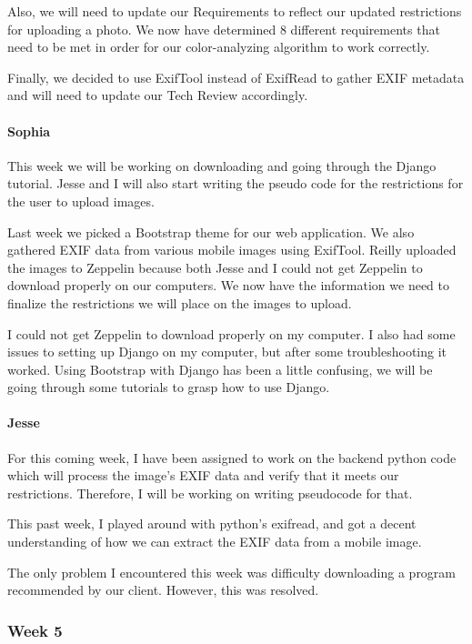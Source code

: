 \documentclass[onecolumn, draftclsnofoot,10pt, compsoc]{IEEEtran}
\begin{document}
\begin{flushleft}
Also, we will need to update our Requirements to reflect our updated restrictions for uploading a photo. We now have determined 8 different requirements that need to be met in order for our color-analyzing algorithm to work correctly.
 
Finally, we decided to use ExifTool instead of ExifRead to gather EXIF metadata and will need to update our Tech Review accordingly.
 
\paragraph{Sophia}
 
This week we will be working on downloading and going through the Django tutorial. Jesse and I will also start writing the pseudo code for the restrictions for the user to upload images.
 
 
Last week we picked a Bootstrap theme for our web application. We also gathered EXIF data from various mobile images using ExifTool. Reilly uploaded the images to Zeppelin because both Jesse and I could not get Zeppelin to download properly on our computers. We now have the information we need to finalize the restrictions we will place on the images to upload.
 
 
I could not get Zeppelin to download properly on my computer. I also had some issues to setting up Django on my computer, but after some troubleshooting it worked. Using Bootstrap with Django has been a little confusing, we will be going through some tutorials to grasp how to use Django.
 
\paragraph{Jesse}
 
For this coming week, I have been assigned to work on the backend python code which will process the image's EXIF data and verify that it meets our restrictions. Therefore, I will be working on writing pseudocode for that.
 
 
This past week, I played around with python's exifread, and got a decent understanding of how we can extract the EXIF data from a mobile image.
 
 
The only problem I encountered this week was difficulty downloading a program recommended by our client. However, this was resolved.
 
\subsubsection{Week 5}

\end{flushleft}
\end{document}
